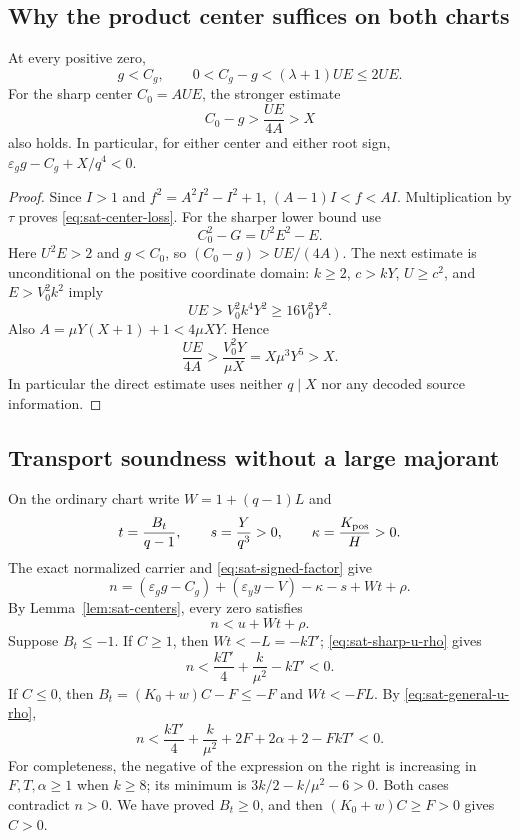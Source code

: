 \subsection{Why the product center suffices on both charts}

\begin{lemma}
\label{lem:sat-centers}
At every positive zero,
\begin{equation}
 g<C_g,
 \qquad 0<C_g-g<(\lambda+1)UE\le2UE.
 \label{eq:sat-center-loss}
\end{equation}
For the sharp center $C_0=AUE$, the stronger estimate
\begin{equation}
 C_0-g>\frac{UE}{4A}>X
 \label{eq:sat-direct-gap}
\end{equation}
also holds.  In particular, for either center and either root sign,
$\varepsilon_g g-C_g+X/q^4<0$.
\end{lemma}

\begin{proof}
Since $I>1$ and $f^2=A^2I^2-I^2+1$,
$(A-1)I<f<AI$.  Multiplication by $\tau$ proves
\eqref{eq:sat-center-loss}.  For the sharper lower bound use
\[
 C_0^2-G=U^2E^2-E.
\]
Here $U^2E>2$ and $g<C_0$, so
$(C_0-g)>UE/(4A)$.  The next estimate is unconditional on the
positive coordinate domain: $k\ge2$, $c>kY$, $U\ge c^2$, and
$E>V_0^2k^2$ imply
\[
 UE>V_0^2k^4Y^2\ge16V_0^2Y^2.
\]
Also $A=\mu Y(X+1)+1<4\mu XY$.  Hence
\[
 \frac{UE}{4A}>
 \frac{V_0^2Y}{\mu X}=X\mu^3Y^5>X.
\]
In particular the direct estimate uses neither $q\mid X$ nor any
decoded source information.
\end{proof}

\subsection{Transport soundness without a large majorant}

On the ordinary chart write $W=1+(q-1)L$ and
\[
 t=\frac{B_t}{q-1},\qquad
 s=\frac{Y}{q^3}>0,\qquad
 \kappa=\frac{K_{\rm pos}}H>0.
\]
The exact normalized carrier and
\eqref{eq:sat-signed-factor} give
\[
 n=(\varepsilon_g g-C_g)+(\varepsilon_y y-V)
       -\kappa-s+Wt+\rho.
\]
By Lemma~\ref{lem:sat-centers}, every zero satisfies
\begin{equation}
 n<u+Wt+\rho.
 \label{eq:sat-transport-upper}
\end{equation}
Suppose $B_t\le-1$.  If $C\ge1$, then $Wt<-L=-kT'$;
\eqref{eq:sat-sharp-u-rho} gives
\[
 n<\frac{kT'}4+\frac{k}{\mu^2}-kT'<0.
\]
If $C\le0$, then $B_t=(K_0+w)C-F\le-F$ and $Wt<-FL$.
By \eqref{eq:sat-general-u-rho},
\[
 n<\frac{kT'}4+\frac{k}{\mu^2}
      +2F+2\alpha+2-FkT'<0.
\]
For completeness, the negative of the expression on the right is
increasing in $F,T,\alpha\ge1$ when $k\ge8$; its minimum is
$3k/2-k/\mu^2-6>0$.  Both cases contradict $n>0$.
We have proved $B_t\ge0$, and then
$(K_0+w)C\ge F>0$ gives $C>0$.


